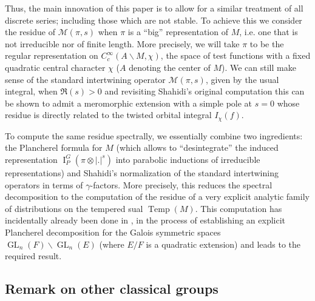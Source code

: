 \documentclass[12pt]{article}
\numberwithin{equation}{section}
\DeclareMathOperator{\Temp}{Temp}
\DeclareMathOperator{\GL}{\mathrm{GL}}
\DeclareMathOperator{\rI}{\mathrm{I}}
\begin{document}
Thus, the main innovation of this paper is to allow for a similar treatment of all discrete series; including those which are not stable. To achieve this we consider the residue of $\mathcal{M}(\pi,s)$ when $\pi$ is a ``big'' representation of $M$, i.e. one that is not irreducible nor of finite length. More precisely, we will take $\pi$ to be the regular representation on $C_c^\infty(A\backslash M,\chi)$, the space of test functions with a fixed quadratic central character $\chi$ ($A$ denoting the center of $M$). We can still make sense of the standard intertwining operator $\mathcal{M}(\pi,s)$, given by the usual integral, when $\Re(s)>0$ and revisiting Shahidi's original computation this can be shown to admit a meromorphic extension with a simple pole at $s=0$ whose residue is directly related to the twisted orbital integral $I_\chi(f)$.

To compute the same residue spectrally, we essentially combine two ingredients: the Plancherel formula for $M$ (which allows to ``desintegrate'' the induced representation $\rI_P^G(\pi\otimes \lvert .\rvert^s)$ into parabolic inductions of irreducible representations) and Shahidi's normalization of the standard intertwining operators in terms of $\gamma$-factors. More precisely, this reduces the spectral decomposition to the computation of the residue of a very explicit analytic family of distributions on the tempered sual $\Temp(M)$. This computation has incidentally already been done in \cite{BPPlanch}, in the process of establishing an explicit Plancherel decomposition for the Galois symmetric spaces $\GL_n(F)\backslash \GL_n(E)$ (where $E/F$ is a quadratic extension) and leads to the required result.

\subsection{Remark on other classical groups}
\end{document}
